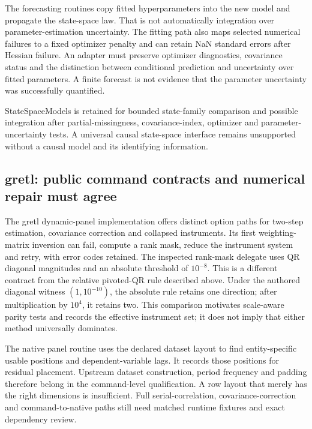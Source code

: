 The forecasting routines copy fitted hyperparameters into the new model and propagate the state-space law. That is not automatically integration over parameter-estimation uncertainty. The fitting path also maps selected numerical failures to a fixed optimizer penalty and can retain NaN standard errors after Hessian failure. An adapter must preserve optimizer diagnostics, covariance status and the distinction between conditional prediction and uncertainty over fitted parameters. A finite forecast is not evidence that the parameter uncertainty was successfully quantified.

StateSpaceModels is retained for bounded state-family comparison and possible integration after partial-missingness, covariance-index, optimizer and parameter-uncertainty tests. A universal causal state-space interface remains unsupported without a causal model and its identifying information.\citep{exec25_odyn_ssm,exec25_odyn_choice}

\subsection{gretl: public command contracts and numerical repair must agree}

The gretl dynamic-panel implementation offers distinct option paths for two-step estimation, covariance correction and collapsed instruments. Its first weighting-matrix inversion can fail, compute a rank mask, reduce the instrument system and retry, with error codes retained. The inspected rank-mask delegate uses QR diagonal magnitudes and an absolute threshold of $10^{-8}$. This is a different contract from the relative pivoted-QR rule described above. Under the authored diagonal witness $(1,10^{-10})$, the absolute rule retains one direction; after multiplication by $10^4$, it retains two. This comparison motivates scale-aware parity tests and records the effective instrument set; it does not imply that either method universally dominates.\citep{exec25_odyn_gretl,exec25_odyn_choice}

The native panel routine uses the declared dataset layout to find entity-specific usable positions and dependent-variable lags. It records those positions for residual placement. Upstream dataset construction, period frequency and padding therefore belong in the command-level qualification. A row layout that merely has the right dimensions is insufficient. Full serial-correlation, covariance-correction and command-to-native paths still need matched runtime fixtures and exact dependency review.

